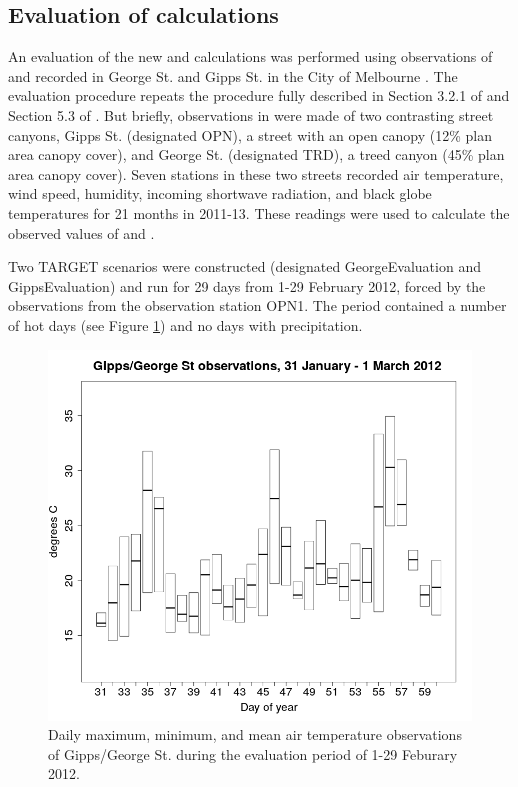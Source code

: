 \documentclass[final,3p,times,authoryear]{elsarticle}
\begin{document}
\subsection{Evaluation of  calculations}\label{sec:methods_eval}

An evaluation of the new  and  calculations was performed using observations of  and  recorded in George St. and Gipps St. in the City of Melbourne \citep{Coutts2015}. The evaluation procedure repeats the procedure fully described in Section 3.2.1 of \cite{Nice2018} and Section 5.3 of \cite{Nice2016}. But briefly, observations in \cite{Coutts2015} were made of two contrasting street canyons, Gipps St. (designated OPN), a street with an open canopy (12\% plan area canopy cover), and George St. (designated TRD), a treed canyon (45\% plan area canopy cover). Seven stations in these two streets recorded air temperature, wind speed, humidity, incoming shortwave radiation, and black globe temperatures for 21 months in 2011-13. These readings were used to calculate the observed values of  and . 


Two TARGET scenarios were constructed (designated GeorgeEvaluation and GippsEvaluation) and run for 29 days from 1-29 February 2012, forced by the observations from the observation station OPN1. The period contained a number of hot days (see Figure \ref{fig:CoMtemp}) and no days with precipitation.


\begin{figure}[!htbp]
\includegraphics[trim = 0mm 0mm 0mm 0mm, clip, scale=0.30]{images/CoMTempFeb2012.png}
\caption{Daily maximum, minimum, and mean air temperature observations of Gipps/George St. during the evaluation period of 1-29 Feburary 2012.\label{fig:CoMtemp}} 
\end{figure}
\end{document}
